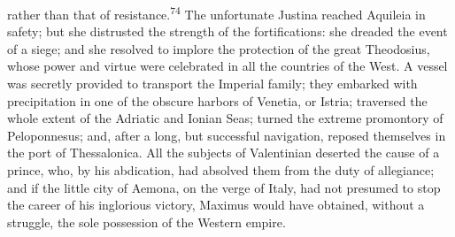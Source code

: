 rather than that of resistance.\textsuperscript{74} The unfortunate Justina
reached Aquileia in safety; but she distrusted the strength of
the fortifications: she dreaded the event of a siege; and she
resolved to implore the protection of the great Theodosius, whose
power and virtue were celebrated in all the countries of the
West. A vessel was secretly provided to transport the Imperial
family; they embarked with precipitation in one of the obscure
harbors of Venetia, or Istria; traversed the whole extent of the
Adriatic and Ionian Seas; turned the extreme promontory of
Peloponnesus; and, after a long, but successful navigation,
reposed themselves in the port of Thessalonica. All the subjects
of Valentinian deserted the cause of a prince, who, by his
abdication, had absolved them from the duty of allegiance; and if
the little city of Aemona, on the verge of Italy, had not
presumed to stop the career of his inglorious victory, Maximus
would have obtained, without a struggle, the sole possession of
the Western empire.




